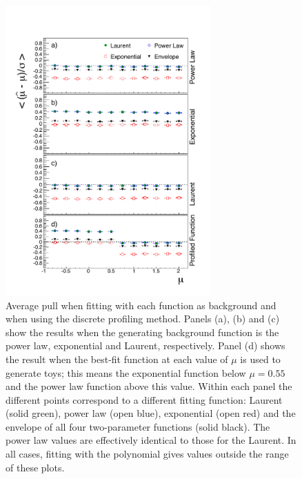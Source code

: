 \begin{figure}[tbp]
\centering
\includegraphics[width=0.7\textwidth]{functions/FirstOrderFunctions.pdf}
\caption{Average pull when fitting with each function as background and when
using the discrete profiling method. Panels (a), (b) and (c) show the results
when the generating background function is the power law, exponential and Laurent,
respectively. Panel (d) shows the result when the best-fit function at each
value of $\mu$ is used to generate toys; this means the exponential function
below $\mu = 0.55$ and the power law function above this value. Within each panel the different
points correspond to a different fitting function: Laurent (solid green), power law (open blue), exponential (open red) and the envelope of all four two-parameter functions (solid black). The power law values are effectively identical
to those for the Laurent.
In all cases,
fitting with the polynomial gives values outside the range of these plots.}
\label{fig:functions:firstorderbias}
\end{figure}

